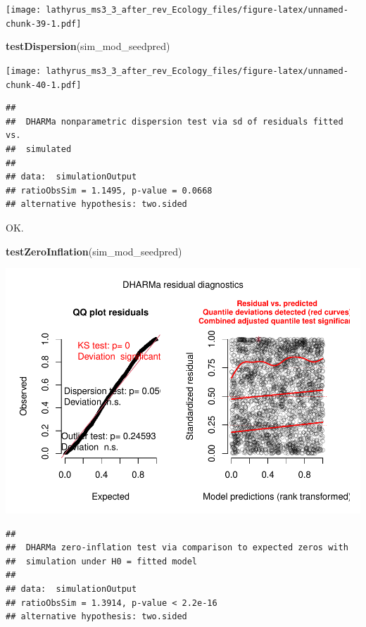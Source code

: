 \documentclass[
]{article}
\newenvironment{Shaded}{\begin{snugshade}}{\end{snugshade}}
\newcommand{\KeywordTok}[1]{\textcolor[rgb]{0.13,0.29,0.53}{\textbf{#1}}}
\newcommand{\NormalTok}[1]{#1}
\begin{document}
\texttt{[image: lathyrus\_ms3\_3\_after\_rev\_Ecology\_files/figure-latex/unnamed-chunk-39-1.pdf]}

\begin{Shaded}
\begin{Highlighting}[]
\KeywordTok{testDispersion}\NormalTok{(sim\_mod\_seedpred)}
\end{Highlighting}
\end{Shaded}

\texttt{[image: lathyrus\_ms3\_3\_after\_rev\_Ecology\_files/figure-latex/unnamed-chunk-40-1.pdf]}

\begin{verbatim}
## 
##  DHARMa nonparametric dispersion test via sd of residuals fitted vs.
##  simulated
## 
## data:  simulationOutput
## ratioObsSim = 1.1495, p-value = 0.0668
## alternative hypothesis: two.sided
\end{verbatim}

OK.

\begin{Shaded}
\begin{Highlighting}[]
\KeywordTok{testZeroInflation}\NormalTok{(sim\_mod\_seedpred)}
\end{Highlighting}
\end{Shaded}

\includegraphics{lathyrus_ms3_3_after_rev_Ecology_files/figure-latex/unnamed-chunk-41-1.pdf}

\begin{verbatim}
## 
##  DHARMa zero-inflation test via comparison to expected zeros with
##  simulation under H0 = fitted model
## 
## data:  simulationOutput
## ratioObsSim = 1.3914, p-value < 2.2e-16
## alternative hypothesis: two.sided
\end{verbatim}
\end{document}

